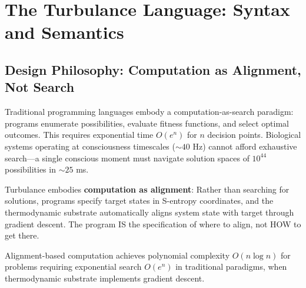 \section{The Turbulance Language: Syntax and Semantics}

\subsection{Design Philosophy: Computation as Alignment, Not Search}

Traditional programming languages embody a computation-as-search paradigm: programs enumerate possibilities, evaluate fitness functions, and select optimal outcomes. This requires exponential time $O(e^n)$ for $n$ decision points. Biological systems operating at consciousness timescales ($\sim 40$ Hz) cannot afford exhaustive search—a single conscious moment must navigate solution spaces of $10^{44}$ possibilities in $\sim 25$ ms.

\begin{definition}
Turbulance embodies \textbf{computation as alignment}: Rather than searching for solutions, programs specify target states in S-entropy coordinates, and the thermodynamic substrate automatically aligns system state with target through gradient descent. The program IS the specification of where to align, not HOW to get there.
\end{definition}

\begin{theorem}
\label{thm:alignment_advantage}
Alignment-based computation achieves polynomial complexity $O(n \log n)$ for problems requiring exponential search $O(e^n)$ in traditional paradigms, when thermodynamic substrate implements gradient descent.
\end{theorem}


